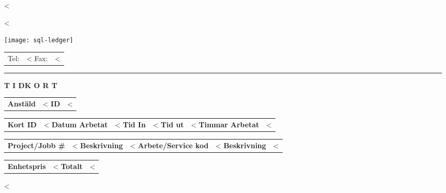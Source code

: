 \documentclass{scrartcl}
\begin{document}
\pagestyle{myheadings}
\thispagestyle{empty}

\fontsize{10pt}{12pt}\selectfont

\vspace*{-1.3cm}

\parbox{\textwidth}{%
  \parbox[b]{.42\textwidth}{%
    <%
   
    <%
  }
  \parbox[b]{.2\textwidth}{
    \texttt{[image: sql-ledger]}
  }\hfill
  \begin{tabular}[b]{rr@{}}
  Tel: & <%
  Fax: & <%
  \end{tabular}

  \rule[1.5em]{\textwidth}{0.5pt}
}

\centerline{\textbf{T I D}\hspace{0.5cm}\textbf{K O R T}}

\vspace*{0.5cm}

\begin{tabular}[t]{ll}
  \textbf{Anstäld} & <%
  \textbf{ID} & <%
\end{tabular}
\hfill
\begin{tabular}[t]{ll}
  \textbf{Kort ID} & <%
  \textbf{Datum Arbetat} & <%
  \textbf{Tid In} & <%
  \textbf{Tid ut} & <%
  \textbf{Timmar Arbetat} & <%
\end{tabular}

\vspace{1cm}

\begin{tabular}[b]{ll}
  \textbf{Project/Jobb \#} & <%
  \textbf{Beskrivning} & <%
  \textbf{Arbete/Service kod} & <%
  \textbf{Beskrivning} & <%
\end{tabular}
\hfill
\begin{tabular}[b]{lr}
  \textbf{Enhetspris} & <%
  \textbf{Totalt} & <%
\end{tabular}
  
\vspace{0.3cm}

<%
 
\end{document}
